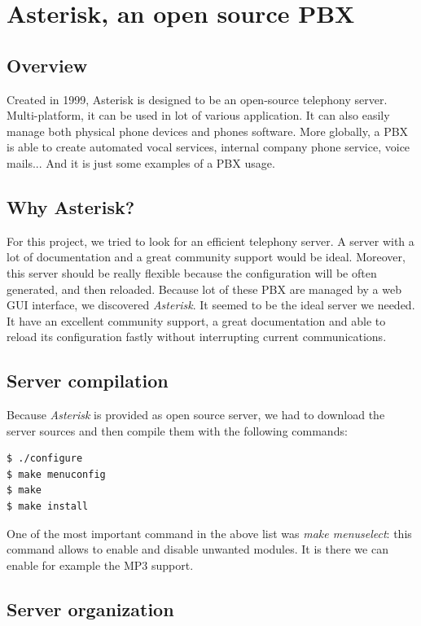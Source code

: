\chapter{Asterisk, an open source PBX}
\section{Overview}
Created in 1999, Asterisk is designed to be an open-source telephony server. Multi-platform, it can be used in lot of various application. It can also easily manage both physical phone devices and phones software. More globally, a PBX is able to create automated vocal services, internal company phone service, voice mails... And it is just some examples of a PBX usage.

\section{Why Asterisk?}
For this project, we tried to look for an efficient telephony server. A server with a lot of documentation and a great community support would be ideal. Moreover, this server should be really flexible because the configuration will be often generated, and then reloaded.
Because lot of these PBX are managed by a web GUI interface, we discovered \textit{Asterisk}. It seemed to be the ideal server we needed. It have an excellent community support, a great documentation and able to reload its configuration fastly without interrupting current communications.

\section{Server compilation}
Because \textit{Asterisk} is provided as open source server, we had to download the server sources and then compile them with the following commands:
\begin{lstlisting}[language=bash,caption={bash}]
$ ./configure
$ make menuconfig
$ make
$ make install
\end{lstlisting}

One of the most important command in the above list was \textit{make menuselect}: this command allows to enable and disable unwanted modules. It is there we can enable for example the MP3 support.

\section{Server organization}

